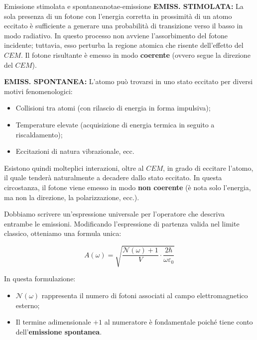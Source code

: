\begin{note}{Emissione stimolata e spontanea}{notae-emissione}
    \textbf{EMISS. STIMOLATA:} La sola presenza di un fotone con l'energia corretta in prossimità di un atomo eccitato è sufficiente a generare una probabilità di transizione verso il basso in modo radiativo. 
    In questo processo non avviene l'assorbimento del fotone incidente; tuttavia, esso perturba la regione atomica che risente dell'effetto del \( CEM \). 
    Il fotone risultante è emesso in modo \textbf{coerente} (ovvero segue la direzione del \( CEM \)).

    \vspace{0.8em}

    \textbf{EMISS. SPONTANEA:} L'atomo può trovarsi in uno stato eccitato per diversi motivi fenomenologici:
    \begin{itemize}
        \item Collisioni tra atomi (con rilascio di energia in forma impulsiva);
        \item Temperature elevate (acquisizione di energia termica in seguito a riscaldamento);
        \item Eccitazioni di natura vibrazionale, ecc.
    \end{itemize}
    Esistono quindi molteplici interazioni, oltre al \( CEM \), in grado di eccitare l'atomo, il quale tenderà naturalmente a decadere dallo stato eccitato. In questa circostanza, il fotone viene emesso in modo \textbf{non coerente} (è nota solo l'energia, ma non la direzione, la polarizzazione, ecc.).
\end{note}

Dobbiamo scrivere un'espressione universale per l'operatore che descriva entrambe le emissioni. Modificando l'espressione di partenza valida nel limite classico, otteniamo una formula unica:

\begin{equation}
    A(\omega) = \sqrt{\frac{\mathcal{N}(\omega) + 1}{V} \cdot \frac{2\hbar}{\omega\varepsilon_0}}
\end{equation}

In questa formulazione:
\begin{itemize}
    \item \( \mathcal{N}(\omega) \) rappresenta il numero di fotoni associati al campo elettromagnetico esterno;
    \item Il termine adimensionale \( +1 \) al numeratore è fondamentale poiché tiene conto dell'\textbf{emissione spontanea}.
\end{itemize}

